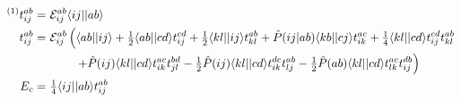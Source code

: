 \documentclass[preview]{standalone}
\newcommand{\op}[1]{\ensuremath{ \hat{#1} } }
\newcommand{\ip}[1]{\ensuremath{\langle#1\rangle}}
\newcommand{\E}{\mathcal{E}}
\begin{document}
\begin{align*}
  {}^{(1)}t_{ij}^{ab}
=&\
  \E_{ij}^{ab}\ip{ij||ab}
\\
  t_{ij}^{ab}
=&\
  \E_{ij}^{ab}
  \left(
    \ip{ab||ij}
  +
    \tfrac{1}{2}
    \ip{ab||cd}t_{ij}^{cd}
  +
    \tfrac{1}{2}
    \ip{kl||ij}t_{kl}^{ab}
  +
    \op{P}(ij|ab)
    \ip{kb||cj}t_{ik}^{ac}
  +
    \tfrac{1}{4}
    \ip{kl||cd}t_{ij}^{cd}t_{kl}^{ab}
  \right.
  \\&\ \hphantom{\E_{ij}^{ab}\ \ }\left.
  +
    \op{P}(ij)
    \ip{kl||cd}t_{ik}^{ac}t_{jl}^{bd}
  -
    \tfrac{1}{2}
    \op{P}(ij)
    \ip{kl||cd}t_{ik}^{dc}t_{lj}^{ab}
  -
    \tfrac{1}{2}
    \op{P}(ab)
    \ip{kl||cd}t_{lk}^{ac}t_{ij}^{db}
  \right)
\\
  E_c
=&\
  \tfrac{1}{4}
  \ip{ij||ab}t_{ij}^{ab}
\end{align*}
\end{document}
